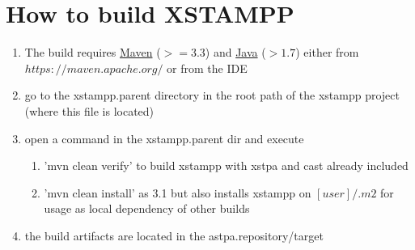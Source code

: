 \section{How to build XSTAMPP}

\begin{enumerate} 
\item The build requires \href{https://maven.apache.org/}{Maven} ($>=3.3$) and \href{http://www.oracle.com/technetwork/java/javase/overview/index.html}{Java} ($>1.7$) either from $https://maven.apache.org/$ or from the IDE
\item go to the xstampp.parent directory in the root path of the xstampp project (where this file is located)
\item open a command in the xstampp.parent dir and execute 
	\begin{enumerate} 
	\item 'mvn clean verify' to build xstampp with xstpa and cast already included
	\item 'mvn clean install' as 3.1 but also installs xstampp on $[user]/.m2$ for usage as local dependency of other builds
	\end{enumerate} 
\item the build artifacts are located in the astpa.repository/target	
\end{enumerate} 